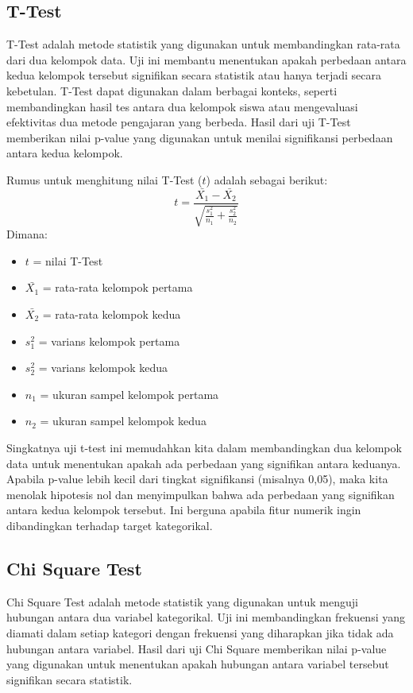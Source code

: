 \subsection{T-Test}
T-Test adalah metode statistik yang digunakan untuk membandingkan rata-rata dari dua kelompok data. Uji ini membantu menentukan apakah perbedaan antara kedua kelompok tersebut signifikan secara statistik atau hanya terjadi secara kebetulan. T-Test dapat digunakan dalam berbagai konteks, seperti membandingkan hasil tes antara dua kelompok siswa atau mengevaluasi efektivitas dua metode pengajaran yang berbeda. Hasil dari uji T-Test memberikan nilai p-value yang digunakan untuk menilai signifikansi perbedaan antara kedua kelompok. \parencite{deveaux2011intro}

Rumus untuk menghitung nilai T-Test ($t$) adalah sebagai berikut:
\begin{equation}
    t = \frac{\bar{X_1} - \bar{X_2}}{\sqrt{\frac{s_1^2}{n_1} + \frac{s_2^2}{n_2}}}
\end{equation}
Dimana:
\begin{itemize}
    \item $t$ = nilai T-Test
    \item $\bar{X_1}$ = rata-rata kelompok pertama
    \item $\bar{X_2}$ = rata-rata kelompok kedua
    \item $s_1^2$ = varians kelompok pertama
    \item $s_2^2$ = varians kelompok kedua
    \item $n_1$ = ukuran sampel kelompok pertama
    \item $n_2$ = ukuran sampel kelompok kedua
\end{itemize}

Singkatnya uji t-test ini memudahkan kita dalam membandingkan dua kelompok data untuk menentukan apakah ada perbedaan yang signifikan antara keduanya. Apabila p-value lebih kecil dari tingkat signifikansi (misalnya 0,05), maka kita menolak hipotesis nol dan menyimpulkan bahwa ada perbedaan yang signifikan antara kedua kelompok tersebut. Ini berguna apabila fitur numerik ingin dibandingkan terhadap target kategorikal.


\subsection{Chi Square Test}
Chi Square Test adalah metode statistik yang digunakan untuk menguji hubungan antara dua variabel kategorikal. Uji ini membandingkan frekuensi yang diamati dalam setiap kategori dengan frekuensi yang diharapkan jika tidak ada hubungan antara variabel. Hasil dari uji Chi Square memberikan nilai p-value yang digunakan untuk menentukan apakah hubungan antara variabel tersebut signifikan secara statistik. \parencite{agresti2018statistical}

